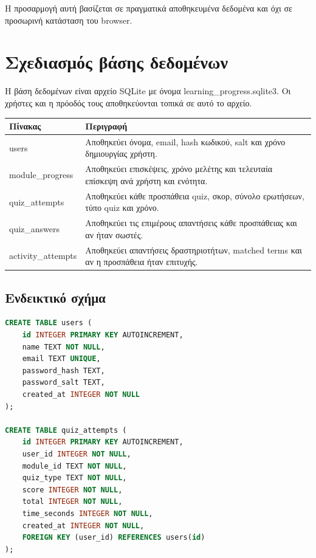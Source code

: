 \documentclass[12pt,a4paper]{article}
\newcommand{\textlatin}[1]{\textenglish{#1}}
\begin{document}
Η προσαρμογή αυτή βασίζεται σε πραγματικά αποθηκευμένα δεδομένα και όχι σε προσωρινή κατάσταση του browser.

\section{Σχεδιασμός βάσης δεδομένων}

Η βάση δεδομένων είναι αρχείο \textlatin{SQLite} με όνομα \textlatin{learning\_progress.sqlite3}. Οι χρήστες και η πρόοδός τους αποθηκεύονται τοπικά σε αυτό το αρχείο.

\begin{longtable}{|p{4cm}|p{10cm}|}
\hline
\textbf{Πίνακας} & \textbf{Περιγραφή} \\
\hline
\textlatin{users} & Αποθηκεύει όνομα, email, hash κωδικού, salt και χρόνο δημιουργίας χρήστη. \\
\hline
\textlatin{module\_progress} & Αποθηκεύει επισκέψεις, χρόνο μελέτης και τελευταία επίσκεψη ανά χρήστη και ενότητα. \\
\hline
\textlatin{quiz\_attempts} & Αποθηκεύει κάθε προσπάθεια quiz, σκορ, σύνολο ερωτήσεων, τύπο quiz και χρόνο. \\
\hline
\textlatin{quiz\_answers} & Αποθηκεύει τις επιμέρους απαντήσεις κάθε προσπάθειας και αν ήταν σωστές. \\
\hline
\textlatin{activity\_attempts} & Αποθηκεύει απαντήσεις δραστηριοτήτων, matched terms και αν η προσπάθεια ήταν επιτυχής. \\
\hline
\end{longtable}

\subsection{Ενδεικτικό σχήμα}

\begin{lstlisting}[language=SQL]
CREATE TABLE users (
    id INTEGER PRIMARY KEY AUTOINCREMENT,
    name TEXT NOT NULL,
    email TEXT UNIQUE,
    password_hash TEXT,
    password_salt TEXT,
    created_at INTEGER NOT NULL
);

CREATE TABLE quiz_attempts (
    id INTEGER PRIMARY KEY AUTOINCREMENT,
    user_id INTEGER NOT NULL,
    module_id TEXT NOT NULL,
    quiz_type TEXT NOT NULL,
    score INTEGER NOT NULL,
    total INTEGER NOT NULL,
    time_seconds INTEGER NOT NULL,
    created_at INTEGER NOT NULL,
    FOREIGN KEY (user_id) REFERENCES users(id)
);
\end{lstlisting}
\end{document}
